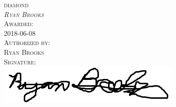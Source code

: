 \documentclass[landscape]{article}
\begin{document}
\begin{center}
\Huge
\textsc{diamond}
\bigskip 
\\  
\textsc{\emph{Ryan Brooks}}
\bigskip
\\ 
\textsc{Awarded:} 
\bigskip
\\ 
\textsc{2018-06-08}
\bigskip
\\ 
\textsc{Authorized by:} 
\bigskip
\\ 
\textsc{Ryan Brooks}
\bigskip
\\ 
\textsc{Signature: }
\bigskip
\\ 
\includegraphics{1528493654735_signature2.PNG}
\end{center}
\end{document}
